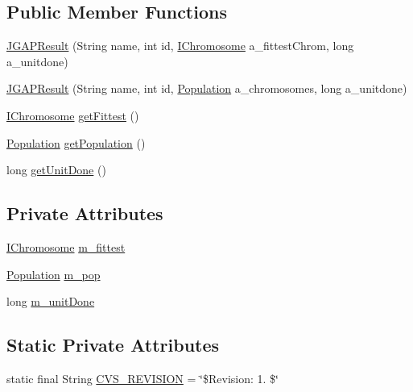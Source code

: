 \subsection*{Public Member Functions}
\begin{DoxyCompactItemize}
\item 
\hyperlink{classorg_1_1jgap_1_1distr_1_1grid_1_1_j_g_a_p_result_aa5a4ea648f81e9de03b110a0425424ea}{J\-G\-A\-P\-Result} (String name, int id, \hyperlink{interfaceorg_1_1jgap_1_1_i_chromosome}{I\-Chromosome} a\-\_\-fittest\-Chrom, long a\-\_\-unitdone)
\item 
\hyperlink{classorg_1_1jgap_1_1distr_1_1grid_1_1_j_g_a_p_result_ab20a68c364e8464afa9d6943519d80aa}{J\-G\-A\-P\-Result} (String name, int id, \hyperlink{classorg_1_1jgap_1_1_population}{Population} a\-\_\-chromosomes, long a\-\_\-unitdone)
\item 
\hyperlink{interfaceorg_1_1jgap_1_1_i_chromosome}{I\-Chromosome} \hyperlink{classorg_1_1jgap_1_1distr_1_1grid_1_1_j_g_a_p_result_a441428a42adeeec029d29320c17189d8}{get\-Fittest} ()
\item 
\hyperlink{classorg_1_1jgap_1_1_population}{Population} \hyperlink{classorg_1_1jgap_1_1distr_1_1grid_1_1_j_g_a_p_result_a7adf6a4de4d6ac846ed1a8878fc488da}{get\-Population} ()
\item 
long \hyperlink{classorg_1_1jgap_1_1distr_1_1grid_1_1_j_g_a_p_result_a996432cff200aa960ff630d3feb172c7}{get\-Unit\-Done} ()
\end{DoxyCompactItemize}
\subsection*{Private Attributes}
\begin{DoxyCompactItemize}
\item 
\hyperlink{interfaceorg_1_1jgap_1_1_i_chromosome}{I\-Chromosome} \hyperlink{classorg_1_1jgap_1_1distr_1_1grid_1_1_j_g_a_p_result_a2702f8ef49d052fa6f3d5bd663276235}{m\-\_\-fittest}
\item 
\hyperlink{classorg_1_1jgap_1_1_population}{Population} \hyperlink{classorg_1_1jgap_1_1distr_1_1grid_1_1_j_g_a_p_result_adb080da341ea89a9e87d57ceafae7248}{m\-\_\-pop}
\item 
long \hyperlink{classorg_1_1jgap_1_1distr_1_1grid_1_1_j_g_a_p_result_a0d3a0f7ebc83c184752243eced88f08b}{m\-\_\-unit\-Done}
\end{DoxyCompactItemize}
\subsection*{Static Private Attributes}
\begin{DoxyCompactItemize}
\item 
static final String \hyperlink{classorg_1_1jgap_1_1distr_1_1grid_1_1_j_g_a_p_result_a41b591ae5da4584bf73415a4d4bdb980}{C\-V\-S\-\_\-\-R\-E\-V\-I\-S\-I\-O\-N} = \char`\"{}\$Revision\-: 1. \$\char`\"{}
\end{DoxyCompactItemize}



